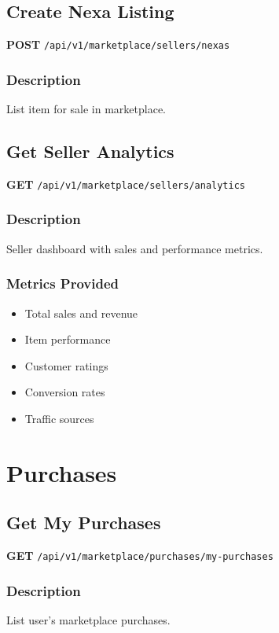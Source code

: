 \documentclass[11pt,a4paper]{report}
\begin{document}
\subsection{Create Nexa Listing}

\textbf{POST} \texttt{/api/v1/marketplace/sellers/nexas}

\subsubsection{Description}
List item for sale in marketplace.

\subsection{Get Seller Analytics}

\textbf{GET} \texttt{/api/v1/marketplace/sellers/analytics}

\subsubsection{Description}
Seller dashboard with sales and performance metrics.

\subsubsection{Metrics Provided}
\begin{itemize}[leftmargin=*]
    \item Total sales and revenue
    \item Item performance
    \item Customer ratings
    \item Conversion rates
    \item Traffic sources
\end{itemize}

\section{Purchases}

\subsection{Get My Purchases}

\textbf{GET} \texttt{/api/v1/marketplace/purchases/my-purchases}

\subsubsection{Description}
List user's marketplace purchases.
\end{document}
